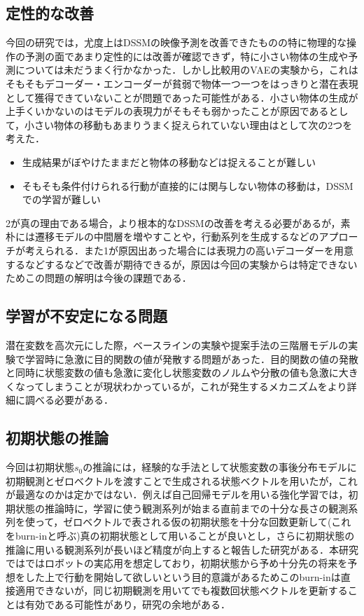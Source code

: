 \subsection{定性的な改善}
今回の研究では，尤度上はDSSMの映像予測を改善できたものの特に物理的な操作の予測の面であまり定性的には改善が確認できず，特に小さい物体の生成や予測については未だうまく行かなかった．しかし比較用のVAEの実験から，これはそもそもデコーダー・エンコーダーが貧弱で物体一つ一つをはっきりと潜在表現として獲得できていないことが問題であった可能性がある．小さい物体の生成が上手くいかないのはモデルの表現力がそもそも弱かったことが原因であるとして，小さい物体の移動もあまりうまく捉えられていない理由はとして次の2つを考えた．
\begin{itemize}
    \item 生成結果がぼやけたままだと物体の移動などは捉えることが難しい
    \item そもそも条件付けられる行動が直接的には関与しない物体の移動は，DSSMでの学習が難しい
\end{itemize}
2が真の理由である場合，より根本的なDSSMの改善を考える必要があるが，素朴には遷移モデルの中間層を増やすことや，行動系列を生成するなどのアプローチが考えられる．また1が原因出あった場合には表現力の高いデコーダーを用意するなどするなどで改善が期待できるが，原因は今回の実験からは特定できないためこの問題の解明は今後の課題である．

\subsection{学習が不安定になる問題}
潜在変数を高次元にした際，ベースラインの実験や提案手法の三階層モデルの実験で学習時に急激に目的関数の値が発散する問題があった．目的関数の値の発散と同時に状態変数の値も急激に変化し状態変数のノルムや分散の値も急激に大きくなってしまうことが現状わかっているが，これが発生するメカニズムをより詳細に調べる必要がある．

\subsection{初期状態の推論}
今回は初期状態$s_0$の推論には，経験的な手法として状態変数の事後分布モデルに初期観測とゼロベクトルを渡すことで生成される状態ベクトルを用いたが，これが最適なのかは定かではない．例えば自己回帰モデルを用いる強化学習\cite{kapturowski2018recurrent}では，初期状態の推論時に，学習に使う観測系列が始まる直前までの十分な長さの観測系列を使って，ゼロベクトルで表される仮の初期状態を十分な回数更新して(これをburn-inと呼ぶ)真の初期状態として用いることが良いとし，さらに初期状態の推論に用いる観測系列が長いほど精度が向上すると報告した研究がある\cite{kapturowski2018recurrent}．本研究ではではロボットの実応用を想定しており，初期状態から予め十分先の将来を予想をした上で行動を開始して欲しいという目的意識があるためこのburn-inは直接適用できないが，同じ初期観測を用いてでも複数回状態ベクトルを更新することは有効である可能性があり，研究の余地がある．

